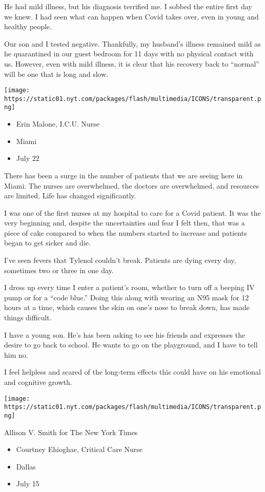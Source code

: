 He had mild illness, but his diagnosis terrified me. I sobbed the entire
first day we knew. I had seen what can happen when Covid takes over,
even in young and healthy people.

Our son and I tested negative. Thankfully, my husband's illness remained
mild as he quarantined in our guest bedroom for 11 days with no physical
contact with us. However, even with mild illness, it is clear that his
recovery back to ``normal'' will be one that is long and slow.

\texttt{[image: https://static01.nyt.com/packages/flash/multimedia/ICONS/transparent.png]}

\begin{itemize}
\tightlist
\item
  Erin Malone, I.C.U. Nurse
\item
  Miami
\item
  July 22
\end{itemize}

There has been a surge in the number of patients that we are seeing here
in Miami. The nurses are overwhelmed, the doctors are overwhelmed, and
resources are limited. Life has changed significantly.

I was one of the first nurses at my hospital to care for a Covid
patient. It was the very beginning and, despite the uncertainties and
fear I felt then, that was a piece of cake compared to when the numbers
started to increase and patients began to get sicker and die.

I've seen fevers that Tylenol couldn't break. Patients are dying every
day, sometimes two or three in one day.

I dress up every time I enter a patient's room, whether to turn off a
beeping IV pump or for a ``code blue.'' Doing this along with wearing an
N95 mask for 12 hours at a time, which causes the skin on one's nose to
break down, has made things difficult.

I have a young son. He's has been asking to see his friends and
expresses the desire to go back to school. He wants to go on the
playground, and I have to tell him no.

I feel helpless and scared of the long-term effects this could have on
his emotional and cognitive growth.

\texttt{[image: https://static01.nyt.com/packages/flash/multimedia/ICONS/transparent.png]}

Allison V. Smith for The New York Times

\begin{itemize}
\tightlist
\item
  Courtney Ehioghae, Critical Care Nurse
\item
  Dallas
\item
  July 15
\end{itemize}


